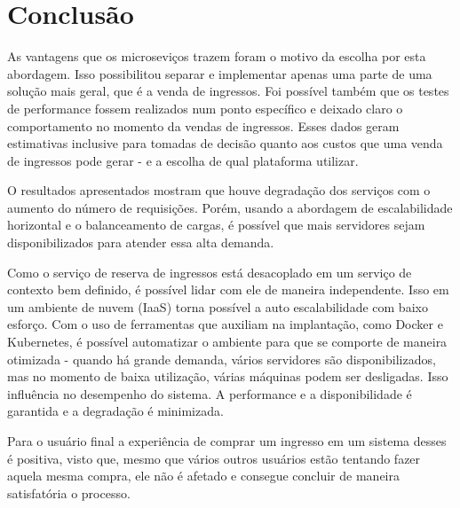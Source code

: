 \chapter*[Conclusão]{Conclusão}

As vantagens que os microseviços trazem foram o motivo da escolha por esta abordagem.
Isso possibilitou separar e implementar apenas uma parte
de uma solução mais geral, que é a venda de ingressos.
Foi possível também que os testes de performance fossem realizados num ponto específico
e deixado claro o comportamento no momento da vendas de ingressos.
Esses dados geram estimativas inclusive para tomadas de decisão quanto aos custos
que uma venda de ingressos pode gerar - e a escolha de qual plataforma utilizar.

O resultados apresentados mostram que houve degradação dos serviços com o aumento do
número de requisições.
Porém, usando a abordagem de escalabilidade horizontal e o balanceamento de cargas,
é possível que mais servidores sejam disponibilizados para atender essa alta demanda.

Como o serviço de reserva de ingressos está desacoplado em um serviço de contexto bem
definido, é possível lidar com ele de maneira independente.
Isso em um ambiente de nuvem (IaaS) torna possível a auto escalabilidade com baixo esforço.
Com o uso de ferramentas que auxiliam na implantação, como Docker e Kubernetes,
é possível automatizar o ambiente para que se comporte de maneira otimizada -
quando há grande demanda, vários servidores são disponibilizados, mas no momento
de baixa utilização, várias máquinas podem ser desligadas.
Isso influência no desempenho do sistema.
A performance e a disponibilidade é garantida e a degradação é minimizada.

Para o usuário final a experiência de comprar um ingresso em um sistema desses
é positiva, visto que, mesmo que vários outros usuários estão tentando
fazer aquela mesma compra, ele não é afetado e consegue concluir de maneira
satisfatória o processo.
